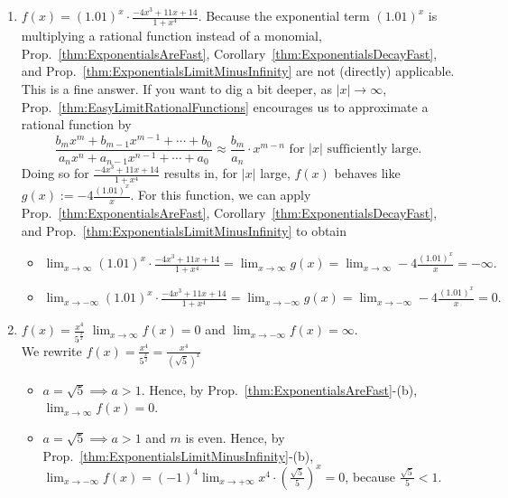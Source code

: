 \begin{enumerate}
\item  $f(x) = (1.01)^x \cdot \frac{-4x^3 + 11 x + 14}{1 + x^4}$. \Ans Because the exponential term $ (1.01)^x$ is multiplying a rational function instead of a monomial, Prop.~\ref{thm:ExponentialsAreFast}, Corollary~\ref{thm:ExponentialsDecayFast}, and Prop.~\ref{thm:ExponentialsLimitMinusInfinity} are not (directly) applicable. This is a fine answer. If you want to dig a bit deeper, as $|x| \to \infty$, Prop.~\ref{thm:EasyLimitRationalFunctions} encourages us to approximate a rational function by 
$$ \frac{b_m x^m + b_{m-1} x^{m-1} +  \cdots + b_0}{a_n x^n + a_{n-1} x^{n-1} +  \cdots + a_0} \approx \frac{b_m }{a_n} \cdot  x^{m-n} \text{ for } |x| \text{ sufficiently large}.$$
Doing so for $\frac{-4x^3 + 11 x + 14}{1 + x^4}$ results in, for $|x|$ large,  $f(x)$ behaves like $g(x) := -4 \frac{(1.01)^x}{x}$. For this function, we can apply Prop.~\ref{thm:ExponentialsAreFast}, Corollary~\ref{thm:ExponentialsDecayFast}, and Prop.~\ref{thm:ExponentialsLimitMinusInfinity} to obtain
\begin{itemize}
    \item $ \displaystyle\lim_{x \to \infty} (1.01)^x \cdot \frac{-4x^3 + 11 x + 14}{1 + x^4} = \displaystyle\lim_{x \to \infty} g(x) = \displaystyle\lim_{x \to \infty} -4 \frac{(1.01)^x}{x} = -\infty.$
     \item $\displaystyle\lim_{x \to -\infty} (1.01)^x \cdot \frac{-4x^3 + 11 x + 14}{1 + x^4} = \displaystyle\lim_{x \to -\infty} g(x) =\displaystyle\lim_{x \to -\infty} -4 \frac{(1.01)^x}{x} = 0.$
\end{itemize}

\item  $f(x) = \frac{x^4}{5^\frac{x}{2}}$  \Ans $\displaystyle\lim_{x \to \infty} f(x) = 0$ and $\displaystyle\lim_{x \to -\infty} f(x) = \infty$.\\

We rewrite $f(x) = \frac{x^4}{5^\frac{x}{2}} = \frac{x^4}{\left( \sqrt{5} \right)^x}$

\begin{itemize}
    \item $a= \sqrt{5} \implies a>1$. Hence, by Prop.~\ref{thm:ExponentialsAreFast}-(b), $\displaystyle\lim_{x \to \infty} f(x) = 0$.
    \item  $a=\sqrt{5} \implies a>1$ and $m$ is even. Hence, by Prop.~\ref{thm:ExponentialsLimitMinusInfinity}-(b), $\displaystyle{ \lim_{x \to -\infty} }f(x) = (-1)^{4} \displaystyle{ \lim_{x \to + \infty} } {x^4} \cdot \left( \frac{ \sqrt{5} }{5} \right)^x = 0$, because $\frac{ \sqrt{5} }{5}<1$.
\end{itemize}

\end{enumerate}
\Qed

